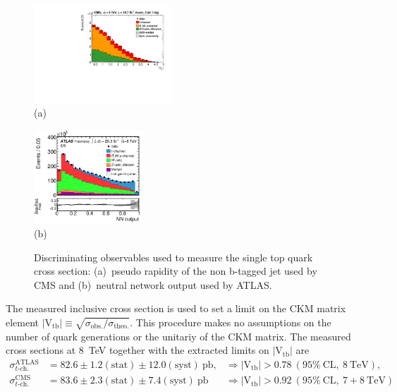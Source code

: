 \documentclass{PoS}
\begin{document}
\begin{figure}[htbp]
\begin{center}
\parbox[t]{0.5\textwidth}{\centering\includegraphics[width=0.46\textwidth]{cms_xsec8/etamuon.pdf}\\(a)}
\parbox[t]{0.42\textwidth}{\centering\includegraphics[width=0.37\textwidth]{atlas_xsec8/nnoutput.pdf}\\(b)}

\end{center}
\caption{\label{fig:fit-xsec-8}Discriminating observables used to measure the single top quark cross section: (a)~pseudo rapidity of the non b-tagged jet used by CMS and (b)~neutral network output used by ATLAS.}

\end{figure}

The measured inclusive cross section is used to set a limit on the CKM matrix element $|\mathrm{V_{tb}}|\equiv\sqrt{\sigma_\mathrm{obs.}/\sigma_\mathrm{theo.}}$. This procedure makes no assumptions on the number of quark generations or the unitariy of the CKM matrix. The measured cross sections at 8~TeV together with the extracted limits on $\mathrm{|V_{tb}|}$ are 
\begin{align}
\sigma_{t\mbox{-}\mathrm{ch.}}^\mathrm{ATLAS}&=82.6\pm1.2\mathrm{(stat)}\pm12.0\mathrm{(syst)}~\mathrm{pb}, &\Rightarrow |\mathrm{V_{tb}}|>0.78~\mathrm{(95\%~CL,~8~TeV)}, \\
\sigma_{t\mbox{-}\mathrm{ch.}}^\mathrm{CMS}&=83.6\pm2.3\mathrm{(stat)}\pm7.4\mathrm{(syst)}~\mathrm{pb} &\Rightarrow |\mathrm{V_{tb}}|>0.92~\mathrm{(95\%~CL,~7+8~TeV)}
\end{align}
\end{document}
